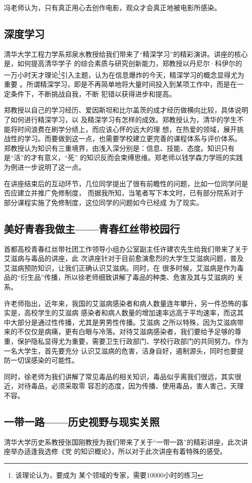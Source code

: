 \documentclass[a4paper]{cctart}
\numberwithin{equation}{section} \pagestyle{fancy}
\begin{document}
冯老师认为，只有真正用心去创作电影，观众才会真正地被电影所感染。
\subsection{深度学习}
清华大学工程力学系郑泉水教授给我们带来了“精深学习”的精彩演讲。讲座的核心是，如何提高清华学子
的综合素质与研究创新能力，郑教授以丹尼尔·科伊尔的一万小时天才理论\footnote{该理论认为，要成为
某个领域的专家，需要10000小时的练习}引入主题，认为在信息爆炸的今天，精深学习的概念显得尤为重要
。所谓精深学习，即是不再简单地将大量时间投入到某项工作中，而是在一定条件下，不断挑战自我，不断
犯错以获得进步和提高。

郑教授以自己的学习经历、爱因斯坦和比尔盖茨的成才经历做横向比较，具体说明了如何进行精深学习，以
及精深学习有怎样的成效。郑教授认为，清华的学生不能将时间浪费在刷学分绩上，而应该心怀的远大的理
想，在热爱的领域，展开挑战性的学习。而要做到这一点，也需要学校建立更完善的课程体系与评价体系。
郑教授认为知识有三重境界，由浅入深分别是：信息、技能、态度。知识只有是“活”的才有意义，“死”
的知识反而会束缚思维。郑老师以钱学森力学班的实践为例进一步说明了这一点。

在讲座结束后的互动环节，几位同学提出了很有前瞻性的问题，比如一位同学问是否应建立并推广免修制度，
而据我所知，当笔者写下本文时，已有部分院系对于部分课程实施了免修制度，这位同学的问题如今已经成
为了现实。
\subsection{美好青春我做主——青春红丝带校园行}
首都高校青春红丝带社团工作领导小组办公室副主任许建农先生给我们带来了关于艾滋病与毒品的讲座，此
次讲座针对于目前愈演愈烈的大学生艾滋病问题，普及艾滋病预防知识，让我们正确认识艾滋病。同时，在
很多时候，艾滋病是作为毒品的“衍生品”传播，所以徐老师细致讲解了毒品的种类、危害及其与艾滋病的
关系。

许老师指出，近年来，我国的艾滋病感染者和病人数量连年攀升，另一件恐怖的事实是，高校学生的艾滋病
感染者和病人数量的增加速率远高于平均速率，而这其中大部分是通过性传播，尤其是男男性传播。艾滋病
之所以特殊，因为艾滋病带来的不仅仅是病痛，更有白眼与冷落。对待艾滋病感染者，我们要给予足够的尊
重，保护隐私显得尤为重要，需要卫生行政部门、学校行政部门的共同努力。作为一名大学生，首先要充分
认识艾滋病的危害，洁身自好，遏制源头，同时也要提防一切误感染的可能性。

同时，徐老师为我们讲解了常见毒品的相关知识，毒品似乎离我们很远，其实很近，对待毒品，必须采取零
容忍的态度，因为传播、使用毒品，害人害己，天理不容。
\subsection{一带一路——历史视野与现实关照}
清华大学历史系教授张国刚教授为我们带来了关于“一带一路”的精彩讲座，此次讲座举办适逢我选修《党
的知识概论》，所以对于此次讲座有着特殊的感受。
\end{document}
